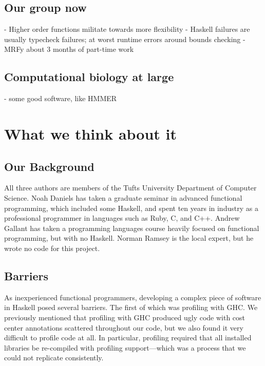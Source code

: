 \documentclass[preprint,nonatbib,blockstyle,nocopyrightspace,times]{sigplanconf}
\begin{document}
\subsection{Our group now}
 - Higher order functions militate towards more flexibility
 - Haskell failures are usually typecheck failures; at worst runtime errors around bounds checking
 - MRFy about 3 months of part-time work

\subsection{Computational biology at large}
 - some good software, like HMMER

\section{What we think about it}

\subsection{Our Background}

All three authors are members of the Tufts University Department of Computer
Science.
Noah Daniels has taken a graduate seminar in advanced functional
programming, which included some Haskell, and spent ten years in industry as a
professional programmer in languages such as Ruby, C, and C++.
Andrew Gallant has taken a programming languages course heavily focused on 
functional programming, but with no Haskell.
Norman Ramsey is the local expert, but he wrote no code for this project.

\subsection{Barriers}

As inexperienced functional programmers, developing a complex piece of
software in Haskell posed several barriers.
The first of which was profiling with GHC.
We previously mentioned that profiling with GHC produced ugly code with
cost center annotations scattered throughout our code, but we also found it
very difficult to profile code at all.
In particular, profiling required that all installed libraries be re-compiled
with profiling support---which was a process that we could not replicate
consistently.
\end{document}
